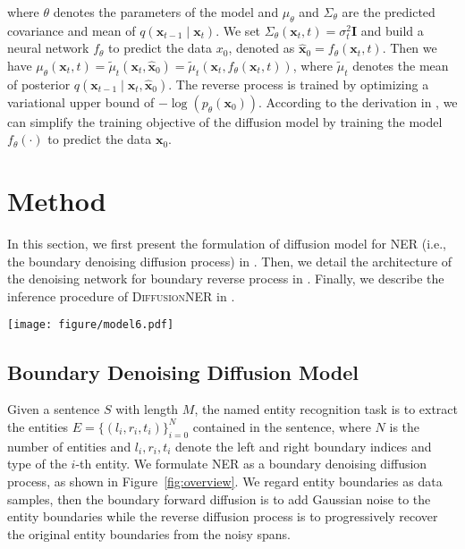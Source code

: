 \documentclass[11pt]{article}
\begin{document}
\noindent where $\theta$ denotes the parameters of the model and ${\mu}_{\theta}$ and ${\Sigma}_\theta$ are the predicted covariance and mean of $q\left(\mathbf{x}_{t-1} \mid \mathbf{x}_t\right)$.
We set ${\Sigma}_\theta\left(\mathbf{x}_t, t\right)=\sigma_t^2 \mathbf{I}$ and build a neural network $f_\theta$ to predict the data $x_0$, denoted as $\hat{\mathbf{x}}_0=f_\theta\left(\mathbf{x}_t, t\right)$. Then we have ${\mu}_\theta\left(\mathbf{x}_t, t\right)=\tilde{{\mu}}_t\left(\mathbf{x}_t, \hat{\mathbf{x}}_0\right)=\tilde{{\mu}}_t\left(\mathbf{x}_t, f_\theta\left(\mathbf{x}_t, t\right)\right)$, where $\tilde{\mu}_t$ denotes the mean of posterior $q\left(\mathbf{x}_{t-1} \mid \mathbf{x}_t,\hat{\mathbf{x}}_0\right)$.
The reverse process is trained by optimizing a variational upper bound of $-\log \left(p_\theta\left(\mathbf{x}_{0}\right)\right)$. According to the derivation in \citet{ddpm}, we can simplify the training objective of the diffusion model by training the model $f_\theta(\cdot)$ to predict the data $\mathbf{x}_0$.


\section{Method}



In this section,  we first present the formulation of diffusion model for NER (i.e., the boundary denoising diffusion process) in . Then, we detail the architecture of the denoising network for boundary reverse process in . Finally, we describe the inference procedure of \textsc{DiffusionNER} in .


\begin{figure*}
    \centering
    \texttt{[image: figure/model6.pdf]}
    \caption{Overview of \textsc{DiffusionNER}. Boundary denoising diffusion process for NER with a denoising network.}
    \label{fig:overview}
\end{figure*}





\subsection{Boundary Denoising Diffusion Model}
\label{sec:3.2}

Given a sentence $S$ with length $M$, the named entity recognition task is to extract the entities $E = \{(l_i, r_i, t_i)\}_{i=0}^{N}$ contained in the sentence, where $N$ is the number of entities and $l_i, r_i, t_i$ denote the left and right boundary indices and type of the $i$-th entity. We formulate NER as a boundary denoising diffusion process, as shown in Figure~\ref{fig:overview}.
We regard entity boundaries as data samples, then the boundary forward diffusion is to add Gaussian noise to the entity boundaries while the reverse diffusion process is to progressively recover the original entity boundaries from the noisy spans.
\end{document}
